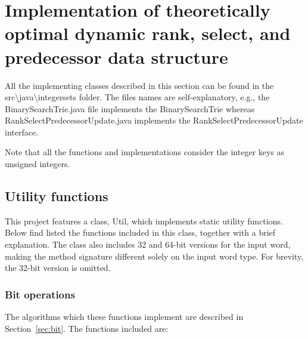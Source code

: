 \chapter{Implementation of theoretically optimal dynamic rank, select, and predecessor data structure}


All the implementing classes described in this section can be found in the {\ttfamily src\textbackslash java\textbackslash integersets} folder. The files names are self-explanatory, e.g., the {\ttfamily BinarySearchTrie.java} file implements the {\ttfamily BinarySearchTrie} whereas {\ttfamily RankSelectPredecessorUpdate.java} implements the {\ttfamily RankSelectPredecessorUpdate} interface.

Note that all the functions and implementations consider the integer keys as unsigned integers.

\section{Utility functions}

This project features a class, {\ttfamily Util}, which implements static utility functions. Below find listed the functions included in this class, together with a brief explanation. The class also includes 32 and 64-bit versions for the input word, making the method signature different solely on the input word type.
For brevity, the 32-bit version is omitted.

\subsection{Bit operations}
The algorithms which these functions implement are described in Section~\ref{sec:bit}.
The functions included are:

